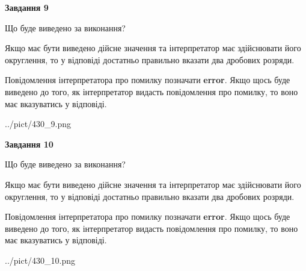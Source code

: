 \documentclass[12pt, ukrainian]{article}
\begin{document}
{\begin {Large}
{\begin {center}\textbf{Завдання 9}\end {center}}\par
Що буде виведено за виконання? \par

Якщо має бути виведено дійсне значення та інтерпретатор має здійснювати його округлення, 
то у відповіді достатньо правильно вказати два дробових розряди.

Повідомлення інтерпретатора про помилку позначати \textbf{error}.
Якщо щось буде виведено до того, як інтерпретатор видасть повідомлення про помилку, 
то воно має вказуватись у відповіді. \par

\begin{center}
	{../pict/430_9.png}
\end{center}
\newpage

{\begin {center}\textbf{Завдання 10}\end {center}}\par
Що буде виведено за виконання? \par

Якщо має бути виведено дійсне значення та інтерпретатор має здійснювати його округлення, 
то у відповіді достатньо правильно вказати два дробових розряди.

Повідомлення інтерпретатора про помилку позначати \textbf{error}.
Якщо щось буде виведено до того, як інтерпретатор видасть повідомлення про помилку, 
то воно має вказуватись у відповіді. \par

\begin{center}
	{../pict/430_10.png}
\end{center}
\newpage

\end {Large}}
\end{document}
